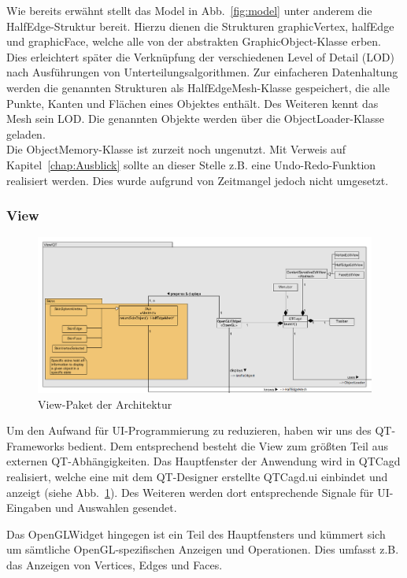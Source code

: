 Wie bereits erwähnt stellt das Model in Abb.~\ref{fig:model} unter anderem die HalfEdge-Struktur bereit. 
Hierzu dienen die Strukturen graphicVertex, halfEdge und graphicFace, welche alle von der abstrakten GraphicObject-Klasse erben. 
Dies erleichtert später die Verknüpfung der verschiedenen Level of Detail (LOD) nach Ausführungen von Unterteilungsalgorithmen. 
Zur einfacheren Datenhaltung werden die genannten Strukturen als HalfEdgeMesh-Klasse gespeichert, die alle Punkte, Kanten und Flächen eines Objektes enthält. 
Des Weiteren kennt das Mesh sein LOD. 
Die genannten Objekte werden über die ObjectLoader-Klasse geladen.\\

Die ObjectMemory-Klasse ist zurzeit noch ungenutzt. 
Mit Verweis auf Kapitel~\ref{chap:Ausblick} sollte an dieser Stelle z.B. eine Undo-Redo-Funktion realisiert werden. 
Dies wurde aufgrund von Zeitmangel jedoch nicht umgesetzt.

\subsubsection{View}
\begin{figure}[htbp]
\includegraphics[angle=90,scale=0.6]{content/pictures/architekturView.png}
\caption{View-Paket der Architektur}
\label{fig:view}
\end{figure}

Um den Aufwand für UI-Programmierung zu reduzieren, haben wir uns des QT-Frameworks bedient. 
Dem entsprechend besteht die View zum größten Teil aus externen QT-Abhängigkeiten. 
Das Hauptfenster der Anwendung wird in QTCagd realisiert, welche eine mit dem QT-Designer erstellte QTCagd.ui einbindet und anzeigt (siehe Abb.~\ref{fig:view}).
Des Weiteren werden dort entsprechende Signale für UI-Eingaben und Auswahlen gesendet.

Das OpenGLWidget hingegen ist ein Teil des Hauptfensters und kümmert sich um sämtliche OpenGL-spezifischen Anzeigen und Operationen.
Dies umfasst z.B. das Anzeigen von Vertices, Edges und Faces. 

